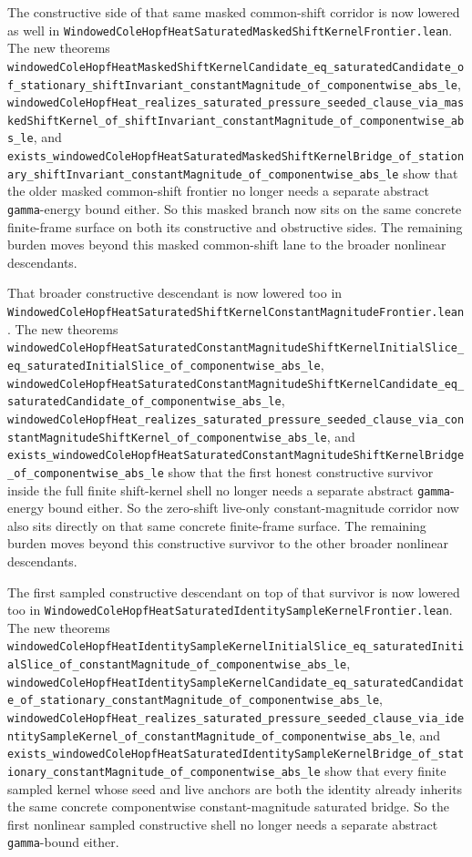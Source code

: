 \documentclass[11pt]{article}
\theoremstyle{remark}
\begin{document}
The constructive side of that same masked common-shift corridor is now lowered
as well in
\texttt{WindowedColeHopfHeatSaturatedMaskedShiftKernelFrontier.lean}.  The new
theorems
\texttt{windowedColeHopfHeatMaskedShiftKernelCandidate\_eq\_saturatedCandidate\_of\_stationary\_shiftInvariant\_constantMagnitude\_of\_componentwise\_abs\_le},
\texttt{windowedColeHopfHeat\_realizes\_saturated\_pressure\_seeded\_clause\_via\_maskedShiftKernel\_of\_shiftInvariant\_constantMagnitude\_of\_componentwise\_abs\_le},
and
\texttt{exists\_windowedColeHopfHeatSaturatedMaskedShiftKernelBridge\_of\_stationary\_shiftInvariant\_constantMagnitude\_of\_componentwise\_abs\_le}
show that the older masked common-shift frontier no longer needs a separate
abstract \texttt{gamma}-energy bound either.  So this masked branch now sits on
the same concrete finite-frame surface on both its constructive and obstructive
sides.  The remaining burden moves beyond this masked common-shift lane to the
broader nonlinear descendants.

That broader constructive descendant is now lowered too in
\texttt{WindowedColeHopfHeatSaturatedShiftKernelConstantMagnitudeFrontier.lean}.
The new theorems
\texttt{windowedColeHopfHeatSaturatedConstantMagnitudeShiftKernelInitialSlice\_eq\_saturatedInitialSlice\_of\_componentwise\_abs\_le},
\texttt{windowedColeHopfHeatSaturatedConstantMagnitudeShiftKernelCandidate\_eq\_saturatedCandidate\_of\_componentwise\_abs\_le},
\texttt{windowedColeHopfHeat\_realizes\_saturated\_pressure\_seeded\_clause\_via\_constantMagnitudeShiftKernel\_of\_componentwise\_abs\_le},
and
\texttt{exists\_windowedColeHopfHeatSaturatedConstantMagnitudeShiftKernelBridge\_of\_componentwise\_abs\_le}
show that the first honest constructive survivor inside the full finite
shift-kernel shell no longer needs a separate abstract \texttt{gamma}-energy
bound either.  So the zero-shift live-only constant-magnitude corridor now
also sits directly on that same concrete finite-frame surface.  The remaining
burden moves beyond this constructive survivor to the other broader nonlinear
descendants.

The first sampled constructive descendant on top of that survivor is now
lowered too in
\texttt{WindowedColeHopfHeatSaturatedIdentitySampleKernelFrontier.lean}.  The
new theorems
\texttt{windowedColeHopfHeatIdentitySampleKernelInitialSlice\_eq\_saturatedInitialSlice\_of\_constantMagnitude\_of\_componentwise\_abs\_le},
\texttt{windowedColeHopfHeatIdentitySampleKernelCandidate\_eq\_saturatedCandidate\_of\_stationary\_constantMagnitude\_of\_componentwise\_abs\_le},
\texttt{windowedColeHopfHeat\_realizes\_saturated\_pressure\_seeded\_clause\_via\_identitySampleKernel\_of\_constantMagnitude\_of\_componentwise\_abs\_le},
and
\texttt{exists\_windowedColeHopfHeatSaturatedIdentitySampleKernelBridge\_of\_stationary\_constantMagnitude\_of\_componentwise\_abs\_le}
show that every finite sampled kernel whose seed and live anchors are both the
identity already inherits the same concrete componentwise constant-magnitude
saturated bridge.  So the first nonlinear sampled constructive shell no longer
needs a separate abstract \texttt{gamma}-bound either.
\end{document}
